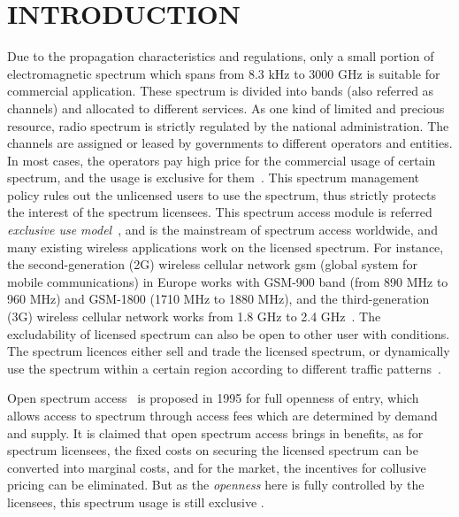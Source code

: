 \chapter{INTRODUCTION}
\label{INTRODUCTION}
Due to the propagation characteristics and regulations, only a small portion of electromagnetic spectrum which spans from 8.3 kHz to 3000 GHz is suitable for commercial application.
These spectrum is divided into bands (also referred as channels) and allocated to different services.
%
As one kind of limited and precious resource, radio spectrum is strictly regulated by the national administration.
The channels are assigned or leased by governments to different operators and entities.
In most cases, the operators pay high price for the commercial usage of certain spectrum, and the usage is exclusive for them~\cite{Spectrum_Management07}.
This spectrum management policy rules out the unlicensed users to use the spectrum, thus strictly protects the interest of the spectrum licensees.
This spectrum access module is referred \textit{exclusive use model}~\cite{zhao_survey_DSA_2007}, and is the mainstream of spectrum access worldwide, and many existing wireless applications work on the licensed spectrum.
For instance, the second-generation (2G) wireless cellular network \gls{gsm} (global system for mobile communications) in Europe works with GSM-900 band (from 890 MHz to 960 MHz) and GSM-1800 (1710 MHz to 1880 MHz), and the third-generation (3G) wireless cellular network works from 1.8 GHz to 2.4 GHz~\cite{wireless_communicatioins2001}.
The excludability of licensed spectrum can also be open to other user with conditions.
The spectrum licences either sell and trade the licensed spectrum, or dynamically use the spectrum within a certain region according to different traffic patterns~\cite{dsa_traffic_2000}.

Open spectrum access~\cite{osa_Noam_1995} is proposed in 1995 for full openness of entry, which allows access to spectrum through access fees which are determined by demand and supply.
It is claimed that open spectrum access brings in benefits, as for spectrum licensees, the fixed costs on securing the licensed spectrum can be converted into marginal costs, and for the market, the incentives for collusive pricing can be eliminated.
But as the \textit{openness} here is fully controlled by the licensees, this spectrum usage is still exclusive .

